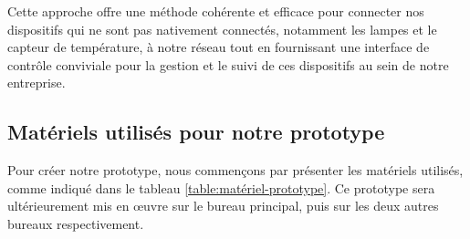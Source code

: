 Cette approche offre une méthode cohérente et efficace pour connecter nos dispositifs qui ne sont pas nativement connectés, notamment les lampes et le capteur de température, à notre réseau tout en fournissant une interface de contrôle conviviale pour la gestion et le suivi de ces dispositifs au sein de notre entreprise.



\subsection{Matériels utilisés pour notre prototype}

Pour créer notre prototype, nous commençons par présenter les matériels utilisés, comme indiqué dans le tableau \ref{table:matériel-prototype}. Ce prototype sera ultérieurement mis en œuvre sur le bureau principal, puis sur les deux autres bureaux respectivement.


